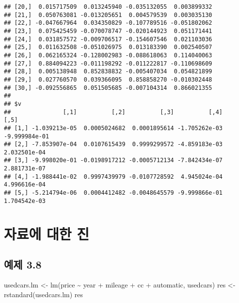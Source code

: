 \documentclass[
]{book}
\newenvironment{Shaded}{\begin{snugshade}}{\end{snugshade}}
\newcommand{\FunctionTok}[1]{\textcolor[rgb]{0.00,0.00,0.00}{#1}}
\newcommand{\NormalTok}[1]{#1}
\newcommand{\OtherTok}[1]{\textcolor[rgb]{0.56,0.35,0.01}{#1}}
\newcommand{\SpecialCharTok}[1]{\textcolor[rgb]{0.00,0.00,0.00}{#1}}
\begin{document}
\begin{verbatim}
## [20,]  0.015717509  0.013245940 -0.035132055  0.003899332
## [21,]  0.050763081 -0.013205651  0.004579539  0.003035130
## [22,] -0.047667964  0.034350829 -0.107789516 -0.051802062
## [23,]  0.075425459 -0.070078747 -0.020144923  0.051171441
## [24,]  0.031857572 -0.009706517 -0.154607546  0.021103036
## [25,]  0.011632508 -0.051026975  0.013183390  0.002540507
## [26,]  0.062165324 -0.128002983 -0.088618063  0.114040063
## [27,]  0.884094223 -0.011198292 -0.011222817 -0.110698609
## [28,]  0.005138948  0.852838832 -0.005407034  0.054821899
## [29,]  0.027760570  0.039366095  0.858858270 -0.010302448
## [30,] -0.092556865  0.051505685 -0.007104314  0.866021355
## 
## $v
##               [,1]          [,2]          [,3]          [,4]          [,5]
## [1,] -1.039213e-05  0.0005024682  0.0001895614 -1.705262e-03 -9.999984e-01
## [2,] -7.853907e-04  0.0107615439  0.9999299572 -4.859183e-03  2.032501e-04
## [3,] -9.998020e-01 -0.0198917212 -0.0005712134 -7.842434e-07  2.881731e-07
## [4,] -1.988441e-02  0.9997439979 -0.0107728592  4.945024e-04  4.996616e-04
## [5,] -5.214794e-06  0.0004412482 -0.0048645579 -9.999866e-01  1.704542e-03
\end{verbatim}

\hypertarget{chapter05}{%
\chapter{자료에 대한 진}\label{chapter05}}

\hypertarget{uxc608uxc81c-3.8}{%
\section{예제 3.8}\label{uxc608uxc81c-3.8}}

\begin{Shaded}
\begin{Highlighting}[]
\NormalTok{usedcars.lm }\OtherTok{\textless{}{-}} \FunctionTok{lm}\NormalTok{(price }\SpecialCharTok{\textasciitilde{}}\NormalTok{ year }\SpecialCharTok{+}\NormalTok{ mileage }\SpecialCharTok{+}\NormalTok{ cc }\SpecialCharTok{+}\NormalTok{ automatic, usedcars)}
\NormalTok{res }\OtherTok{\textless{}{-}} \FunctionTok{rstandard}\NormalTok{(usedcars.lm)}
\NormalTok{res}
\end{Highlighting}
\end{Shaded}
\end{document}
